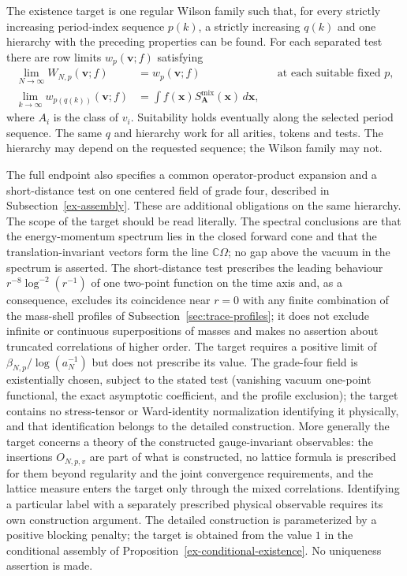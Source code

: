 The existence target is one regular Wilson family such that, for every
strictly increasing period-index sequence \(p(k)\), a strictly increasing
\(q(k)\) and one hierarchy with the preceding properties can be found.
For each separated test there are row limits \(w_p(\boldsymbol v;f)\)
satisfying
\begin{align}
 \lim_{N\to\infty}W_{N,p}(\boldsymbol v;f)
   &=w_p(\boldsymbol v;f)
       &&\text{at each suitable fixed }p,\label{ex-row-target}\\
 \lim_{k\to\infty}w_{p(q(k))}(\boldsymbol v;f)
   &=\int f(\boldsymbol x)
           S^{\mathrm{mix}}_{\boldsymbol A}(\boldsymbol x)\,d\boldsymbol x,
       \label{ex-volume-target}
\end{align}
where \(A_i\) is the class of \(v_i\). Suitability holds eventually
along the selected period sequence. The same \(q\) and hierarchy work for
all arities, tokens and tests. The hierarchy may depend on the requested
sequence; the Wilson family may not.

The full endpoint also specifies a common operator-product expansion and a
short-distance test on one centered field of grade four, described in
Subsection~\ref{ex-assembly}. These are additional obligations on the same
hierarchy. The scope of the target should be read literally. The spectral
conclusions are that the energy-momentum spectrum lies in the closed forward
cone and that the translation-invariant vectors form the line
\(\mathbb C\Omega\); no gap above the vacuum in the spectrum is asserted.
The short-distance test prescribes the leading behaviour
\(r^{-8}\log^{-2}(r^{-1})\) of one two-point function on the time axis and,
as a consequence, excludes its coincidence near \(r=0\) with any finite
combination of the mass-shell profiles of Subsection~\ref{sec:trace-profiles};
it does not exclude infinite or continuous superpositions of masses and makes
no assertion about truncated correlations of higher order. The target
requires a positive limit of \(\beta_{N,p}/\log(a_N^{-1})\) but does not
prescribe its value. The grade-four field is existentially chosen, subject
to the stated test (vanishing vacuum one-point functional, the exact
asymptotic coefficient, and the profile exclusion); the target contains no
stress-tensor or Ward-identity normalization identifying it physically, and
that identification belongs to the detailed construction. More generally the
target concerns a theory of the constructed gauge-invariant observables: the
insertions \(O_{N,p,v}\) are part of what is constructed, no lattice formula
is prescribed for them beyond regularity and the joint convergence
requirements, and the lattice measure enters the target only through the
mixed correlations. Identifying a particular label with a separately
prescribed physical observable requires its own construction argument.
The detailed construction is parameterized by a positive blocking penalty;
the target is obtained from the value \(1\) in the conditional assembly of
Proposition~\ref{ex-conditional-existence}. No uniqueness assertion is made.

